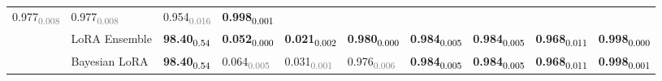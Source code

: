 \begin{table*}[htb]
\begin{tabular}{c|l|*{8}{l}}
0.977\textsubscript{\textcolor{gray}{0.008}} & 0.977\textsubscript{\textcolor{gray}{0.008}} & 
0.954\textsubscript{\textcolor{gray}{0.016}} & \textbf{0.998}\textsubscript{\textcolor{black}{0.001}} \\
& LoRA Ensemble &  
\textbf{98.40}\textsubscript{\textcolor{black}{0.54}} & \textbf{0.052}\textsubscript{\textcolor{black}{0.000}} & 
\textbf{0.021}\textsubscript{\textcolor{black}{0.002}} & \textbf{0.980}\textsubscript{\textcolor{black}{0.000}} & 
\textbf{0.984}\textsubscript{\textcolor{black}{0.005}} & \textbf{0.984}\textsubscript{\textcolor{black}{0.005}} & 
\textbf{0.968}\textsubscript{\textcolor{black}{0.011}} & \textbf{0.998}\textsubscript{\textcolor{black}{0.000}} \\
& Bayesian LoRA & 
\textbf{98.40}\textsubscript{\textcolor{black}{0.54}} & 0.064\textsubscript{\textcolor{gray}{0.005}} & 
0.031\textsubscript{\textcolor{gray}{0.001}} & 0.976\textsubscript{\textcolor{gray}{0.006}} & 
\textbf{0.984}\textsubscript{\textcolor{black}{0.005}} & \textbf{0.984}\textsubscript{\textcolor{black}{0.005}} & 
\textbf{0.968}\textsubscript{\textcolor{black}{0.011}} & \textbf{0.998}\textsubscript{\textcolor{black}{0.001}} \\
\bottomrule
\end{tabular}
\end{table*}